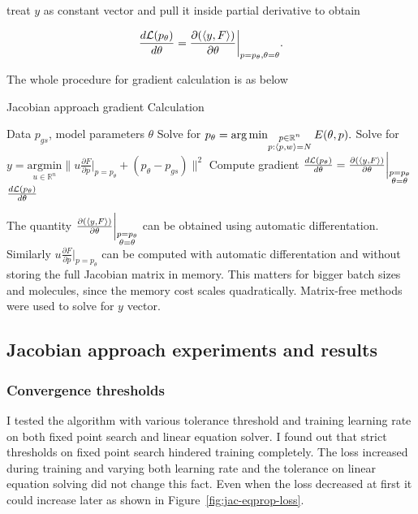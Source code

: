 \documentclass[a4paper,10.5pt]{report}
\begin{document}
treat $y$ as constant vector and pull it inside partial derivative to obtain

\begin{equation}
 \frac{d\mathcal{L}(p_\theta)}{d \theta} =   \frac{\partial (\langle y, F \rangle)}{\partial \theta}\bigg|_{p=p_\theta, \theta=\theta}.
\end{equation}



The whole procedure for gradient calculation is as below
\begin{algorithm}[H]
\caption{Jacobian approach gradient Calculation}
\begin{algorithmic}[1]
\Require Data $p_{gs}$, model parameters $\theta$
\State  Solve for $p_\theta  = \operatorname*{arg\,min}_{\substack{p \in \mathbb{R}^n \\ p: \langle p, w \rangle=N }} E(\theta, p).$
\State Solve for $y = \underset{u\in \mathbb{R}^n}{\mathrm{argmin}} \bigg\|u \frac{\partial F}{\partial p}\bigg|_{p=p_\theta} + (p_\theta-p_{gs})\bigg\|^2$
\State Compute gradient $\frac{d\mathcal{L}(p_\theta)}{d \theta} = \frac{\partial (\langle y, F \rangle)}{\partial \theta}\bigg|_{\substack{p=p_\theta \\\theta= \theta}}$
\State \Return $\frac{d\mathcal{L}(p_\theta)}{d \theta}$
\end{algorithmic}
\end{algorithm}


The quantity $\frac{\partial (\langle y, F \rangle)}{\partial \theta}\bigg|_{\substack{p=p_\theta \\\theta= \theta}}$ can be obtained using automatic differentation.  Similarly $u \frac{\partial F}{\partial p}\bigg|_{p=p_\theta}$ can be computed with automatic differentation and without storing the full Jacobian matrix in memory. This matters for bigger batch sizes and molecules, since the memory cost scales quadratically. Matrix-free methods were used to solve for $y$ vector.


\subsection{Jacobian approach experiments and results}

\subsubsection{Convergence thresholds}
 I tested the algorithm with various tolerance threshold and training learning rate on both fixed point search and linear equation solver.
I found out that strict thresholds on fixed point search hindered training completely. The loss increased during training and varying both learning rate and the tolerance on linear equation solving did not change this fact. Even when the loss decreased at first it could increase later as shown in Figure~\ref{fig:jac-eqprop-loss}.
\end{document}
